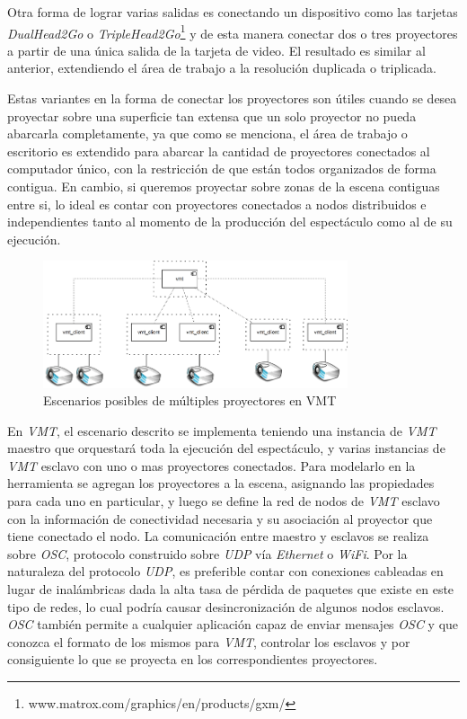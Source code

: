 Otra forma de lograr varias salidas es conectando un dispositivo como las tarjetas \emph{DualHead2Go} o \emph{TripleHead2Go}\footnote{www.matrox.com/graphics/en/products/gxm/} y de esta manera conectar dos o tres proyectores a partir de una única salida de la tarjeta de video. El resultado es similar al anterior, extendiendo el área de trabajo a la resolución duplicada o triplicada.

Estas variantes en la forma de conectar los proyectores son útiles cuando se desea proyectar sobre una superficie tan extensa que un solo proyector no pueda abarcarla completamente, ya que como se menciona, el área de trabajo o escritorio es extendido para abarcar la cantidad de proyectores conectados al computador único, con la restricción de que están todos organizados de forma contigua. En cambio, si queremos proyectar sobre zonas de la escena contiguas entre si, lo ideal es contar con proyectores conectados a nodos distribuidos e independientes tanto al momento de la producción del espectáculo como al de su ejecución.

\begin{figure}[H]
  \centering
    \includegraphics[width=0.8\textwidth]{./Cap5_vmt/vmt_multiProjector.png}
  \caption{Escenarios posibles de múltiples proyectores en VMT}%
  \label{fig:VMT-MultiProjector}
\end{figure}


En \emph{VMT}, el escenario descrito se implementa teniendo una instancia de \emph{VMT} maestro que orquestará toda la ejecución del espectáculo, y varias instancias de \emph{VMT} esclavo con uno o mas proyectores conectados. Para modelarlo en la herramienta se agregan los proyectores a la escena, asignando las propiedades para cada uno en particular, y luego se define la red de nodos de \emph{VMT} esclavo con la información de conectividad necesaria y su asociación al proyector que tiene conectado el nodo. La comunicación entre maestro y esclavos se realiza sobre \emph{OSC}, protocolo construido sobre \emph{UDP} vía \emph{Ethernet} o \emph{WiFi}. Por la naturaleza del protocolo \emph{UDP}, es preferible contar con conexiones cableadas en lugar de inalámbricas dada la alta tasa de pérdida de paquetes que existe en este tipo de redes, lo cual podría causar desincronización de algunos nodos esclavos. \emph{OSC} también permite a cualquier aplicación capaz de enviar mensajes \emph{OSC} y que conozca el formato de los mismos para \emph{VMT}, controlar los esclavos y por consiguiente lo que se proyecta en los correspondientes proyectores.


